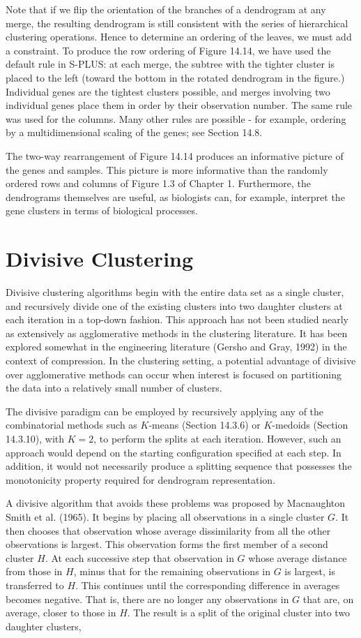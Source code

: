 \documentclass[10pt]{article}
\begin{document}
Note that if we flip the orientation of the branches of a dendrogram at any merge, the resulting dendrogram is still consistent with the series of hierarchical clustering operations. Hence to determine an ordering of the leaves, we must add a constraint. To produce the row ordering of Figure 14.14, we have used the default rule in S-PLUS: at each merge, the subtree with the tighter cluster is placed to the left (toward the bottom in the rotated dendrogram in the figure.) Individual genes are the tightest clusters possible, and merges involving two individual genes place them in order by their observation number. The same rule was used for the columns. Many other rules are possible - for example, ordering by a multidimensional scaling of the genes; see Section 14.8.

The two-way rearrangement of Figure 14.14 produces an informative picture of the genes and samples. This picture is more informative than the randomly ordered rows and columns of Figure 1.3 of Chapter 1. Furthermore, the dendrograms themselves are useful, as biologists can, for example, interpret the gene clusters in terms of biological processes.

\section*{Divisive Clustering}
Divisive clustering algorithms begin with the entire data set as a single cluster, and recursively divide one of the existing clusters into two daughter clusters at each iteration in a top-down fashion. This approach has not been studied nearly as extensively as agglomerative methods in the clustering literature. It has been explored somewhat in the engineering literature (Gersho and Gray, 1992) in the context of compression. In the clustering setting, a potential advantage of divisive over agglomerative methods can occur when interest is focused on partitioning the data into a relatively small number of clusters.

The divisive paradigm can be employed by recursively applying any of the combinatorial methods such as $K$-means (Section 14.3.6) or $K$-medoids (Section 14.3.10), with $K=2$, to perform the splits at each iteration. However, such an approach would depend on the starting configuration specified at each step. In addition, it would not necessarily produce a splitting sequence that possesses the monotonicity property required for dendrogram representation.

A divisive algorithm that avoids these problems was proposed by Macnaughton Smith et al. (1965). It begins by placing all observations in a single cluster $G$. It then chooses that observation whose average dissimilarity from all the other observations is largest. This observation forms the first member of a second cluster $H$. At each successive step that observation in $G$ whose average distance from those in $H$, minus that for the remaining observations in $G$ is largest, is transferred to $H$. This continues until the corresponding difference in averages becomes negative. That is, there are no longer any observations in $G$ that are, on average, closer to those in $H$. The result is a split of the original cluster into two daughter clusters,
\end{document}
